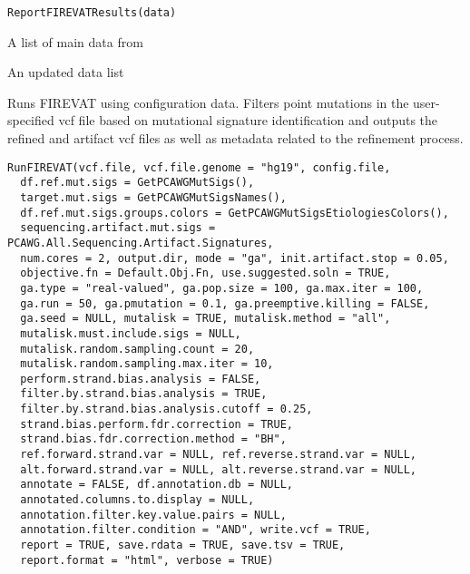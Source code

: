 \documentclass[letterpaper]{book}
\begin{document}
%
\begin{Usage}
\begin{verbatim}
ReportFIREVATResults(data)
\end{verbatim}
\end{Usage}
%
\begin{Arguments}
\begin{ldescription}
\item[\code{data}] A list of main data from 
\end{ldescription}
\end{Arguments}
%
\begin{Value}
An updated data list
\end{Value}
%
\begin{Description}\relax
Runs FIREVAT using configuration data. Filters point mutations in the user-specified vcf file based on mutational signature
identification and outputs the refined and artifact vcf files as well as metadata related to the refinement process.
\end{Description}
%
\begin{Usage}
\begin{verbatim}
RunFIREVAT(vcf.file, vcf.file.genome = "hg19", config.file,
  df.ref.mut.sigs = GetPCAWGMutSigs(),
  target.mut.sigs = GetPCAWGMutSigsNames(),
  df.ref.mut.sigs.groups.colors = GetPCAWGMutSigsEtiologiesColors(),
  sequencing.artifact.mut.sigs = PCAWG.All.Sequencing.Artifact.Signatures,
  num.cores = 2, output.dir, mode = "ga", init.artifact.stop = 0.05,
  objective.fn = Default.Obj.Fn, use.suggested.soln = TRUE,
  ga.type = "real-valued", ga.pop.size = 100, ga.max.iter = 100,
  ga.run = 50, ga.pmutation = 0.1, ga.preemptive.killing = FALSE,
  ga.seed = NULL, mutalisk = TRUE, mutalisk.method = "all",
  mutalisk.must.include.sigs = NULL,
  mutalisk.random.sampling.count = 20,
  mutalisk.random.sampling.max.iter = 10,
  perform.strand.bias.analysis = FALSE,
  filter.by.strand.bias.analysis = TRUE,
  filter.by.strand.bias.analysis.cutoff = 0.25,
  strand.bias.perform.fdr.correction = TRUE,
  strand.bias.fdr.correction.method = "BH",
  ref.forward.strand.var = NULL, ref.reverse.strand.var = NULL,
  alt.forward.strand.var = NULL, alt.reverse.strand.var = NULL,
  annotate = FALSE, df.annotation.db = NULL,
  annotated.columns.to.display = NULL,
  annotation.filter.key.value.pairs = NULL,
  annotation.filter.condition = "AND", write.vcf = TRUE,
  report = TRUE, save.rdata = TRUE, save.tsv = TRUE,
  report.format = "html", verbose = TRUE)
\end{verbatim}
\end{Usage}
\end{document}
